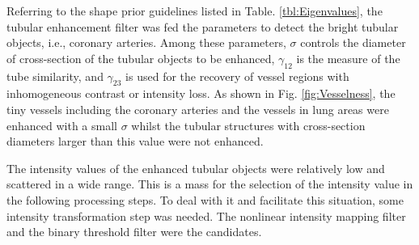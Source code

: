 Referring to the shape prior guidelines listed in Table. \ref{tbl:Eigenvalues}, the tubular enhancement filter was fed the parameters to detect the bright tubular objects, i.e., coronary arteries. %
Among these parameters, $\sigma$ controls the diameter of cross-section of the tubular objects to be enhanced, $\gamma_{12}$ is the measure of the tube similarity, and $\gamma_{23}$ is used for the recovery of vessel regions with inhomogeneous contrast or intensity loss. %
As shown in Fig. \ref{fig:Vesselness}, the tiny vessels including the coronary arteries and the vessels in lung areas were enhanced with a small $\sigma$ whilst the tubular structures with cross-section diameters larger than this value were not enhanced. %

The intensity values of the enhanced tubular objects were relatively low and scattered in a wide range.
This is a mass for the selection of the intensity value in the following processing steps.
To deal with it and facilitate this situation, some intensity transformation step was needed.
The nonlinear intensity mapping filter and the binary threshold filter were the candidates.


